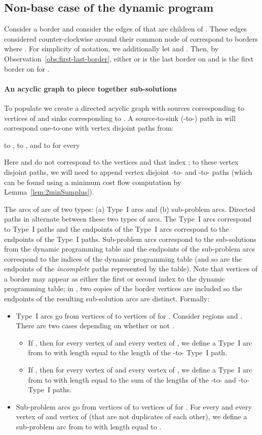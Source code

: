 \documentclass[11pt,twoside]{article}
\begin{document}
\subsection{Non-base case of the dynamic program}

Consider a border  and consider the edges of  that are children of .  These edges considered counter-clockwise around their common node of  correspond to borders  where .  For simplicity of notation, we additionally let  and .
Then, by Observation~\ref{obs:first-last-border}, either  or  is the last border on  and  is the first border on  for .


\paragraph{An acyclic graph  to piece together sub-solutions}
To populate  we create a directed acyclic graph  with sources corresponding to vertices of  and sinks corresponding to .  A source-to-sink (-to-) path in  will correspond one-to-one with vertex disjoint paths from:
\begin{center}
   to ,  to , and  to  for every 
\end{center}
Here  and  do not correspond to the vertices  and  that index ; to these vertex disjoint paths, we will need to append vertex disjoint -to- and -to- paths (which can be found using a minimum cost flow computation by Lemma~\ref{lem:2minSumplus}).

The arcs of  are of two types: (a) Type~I arcs and (b) sub-problem arcs.  Directed paths in  alternate between these two types of arcs.  The Type~I arcs correspond to Type~I paths and the endpoints of the Type~I arcs correspond to the endpoints of the Type~I paths.
Sub-problem arcs correspond to the sub-solutions from the dynamic programming table and the endpoints of the sub-problem arcs correspond to the indices of the dynamic programming table (and so are the endpoints of the {\em incomplete} paths represented by the table).  Note that vertices of a border may appear as either the first or second index to the dynamic programming table; in , two copies of the border vertices are included so the endpoints of the resulting sub-solution arcs are distinct.  Formally:
\begin{itemize}
\item Type~I arcs go from vertices of  to vertices of  for .  Consider regions  and .  There are two cases depending on whether or not .
  \begin{itemize}
  \item If , then for every vertex  of  and every vertex  of , we define a Type~I arc from  to  with length equal to the length of the -to- Type~I path.
  \item If , then for every vertex  of  and every vertex  of , we define a Type~I arc from  to  with length equal to the sum of the lengths of the -to- and -to- Type~I paths.
  \end{itemize}
\item Sub-problem arcs go from vertices of  to vertices of  for . For every  and every vertex  of  and vertex  of  (that are not duplicates of each other), we define a sub-problem arc from  to  with length equal to .
\end{itemize}
\end{document}
